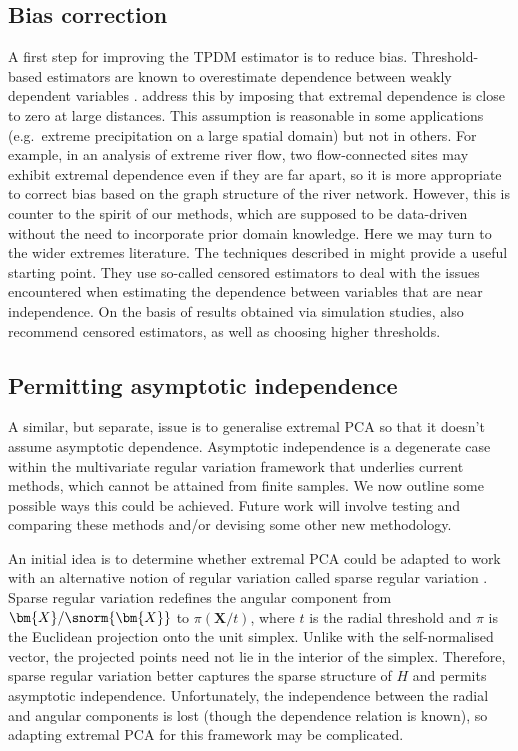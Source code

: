 \documentclass[en-GB, a4paper, nobind]{templates/bathreport}
\begin{document}
\hypertarget{bias-correction}{%
\subsection{Bias correction}\label{bias-correction}}

A first step for improving the TPDM estimator is to reduce bias. Threshold-based estimators are known to overestimate dependence between weakly dependent variables \autocite{huserLikelihoodEstimatorsMultivariate2016}. \textcite{fixSimultaneousAutoregressiveModels2021} address this by imposing that extremal dependence is close to zero at large distances. This assumption is reasonable in some applications (e.g.~extreme precipitation on a large spatial domain) but not in others. For example, in an analysis of extreme river flow, two flow-connected sites may exhibit extremal dependence even if they are far apart, so it is more appropriate to correct bias based on the graph structure of the river network. However, this is counter to the spirit of our methods, which are supposed to be data-driven without the need to incorporate prior domain knowledge. Here we may turn to the wider extremes literature. The techniques described in \textcite{ledfordStatisticsIndependenceMultivariate1996} might provide a useful starting point. They use so-called censored estimators to deal with the issues encountered when estimating the dependence between variables that are near independence. On the basis of results obtained via simulation studies, \textcite{huserLikelihoodEstimatorsMultivariate2016} also recommend censored estimators, as well as choosing higher thresholds.

\hypertarget{permitting-asymptotic-independence}{%
\subsection{Permitting asymptotic independence}\label{permitting-asymptotic-independence}}

A similar, but separate, issue is to generalise extremal PCA so that it doesn't assume asymptotic dependence. Asymptotic independence is a degenerate case within the multivariate regular variation framework that underlies current methods, which cannot be attained from finite samples. We now outline some possible ways this could be achieved. Future work will involve testing and comparing these methods and/or devising some other new methodology.

An initial idea is to determine whether extremal PCA could be adapted to work with an alternative notion of regular variation called sparse regular variation \autocite{meyerSparseRegularVariation2021}. Sparse regular variation redefines the angular component from \(\bm{X}/\snorm{\bm{X}}\) to \(\pi(\bm{X}/t)\), where \(t\) is the radial threshold and \(\pi\) is the Euclidean projection onto the unit simplex. Unlike with the self-normalised vector, the projected points need not lie in the interior of the simplex. Therefore, sparse regular variation better captures the sparse structure of \(H\) and permits asymptotic independence. Unfortunately, the independence between the radial and angular components is lost (though the dependence relation is known), so adapting extremal PCA for this framework may be complicated.
\end{document}
